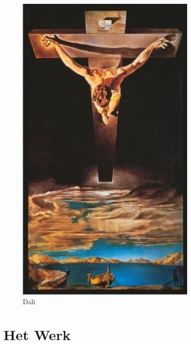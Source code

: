 \documentclass[10pt,twoside, openright]{memoir}
\begin{document}
\begin{figure}
\centering
\includegraphics[width=0.8\textwidth]{img/ch31/dali}
\caption*{\footnotesize Dali}
\end{figure}


\part{Het Werk}
\end{document}
